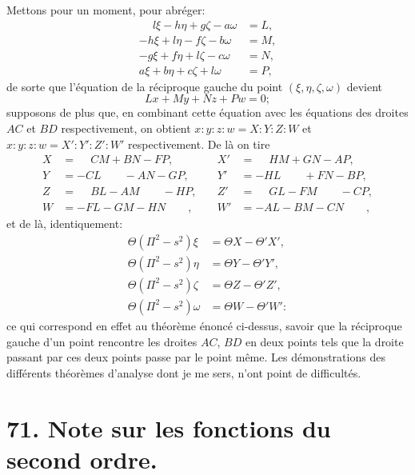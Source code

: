 \documentclass[11pt,a4paper]{book}
\begin{document}
\newpage

\setcounter{page}{420}

Mettons pour un moment, pour abr\'{e}ger:
\begin{align*}
\phantom{-}l\xi - h\eta + g\zeta - a\omega &= L, \\
-h\xi + l\eta - f\zeta - b\omega &= M, \\
-g\xi + f\eta + l\zeta - c\omega &= N, \\
a\xi + b\eta + c\zeta + l\omega &= P,
\end{align*}
de sorte que l'\'{e}quation de la r\'{e}ciproque gauche du point $(\xi, \eta, \zeta, \omega)$ devient
\[
Lx + My + Nz + Pw = 0;
\]
supposons de plus que, en combinant cette \'{e}quation avec les \'{e}quations des droites $AC$ et $BD$ respectivement, on obtient $x:y:z:w = X:Y:Z:W$ et $x:y:z:w = X':Y':Z':W'$ respectivement. De l\`{a} on tire
\begin{align*}
X &= \phantom{-}CM + BN - FP, &\quad X' &= \phantom{-}HM + GN - AP, \\
Y &= -CL \qquad - AN - GP, &\quad Y' &= -HL \qquad + FN - BP, \\
Z &= \phantom{-}BL - AM \qquad - HP, &\quad Z' &= \phantom{-}GL - FM \qquad - CP, \\
W &= -FL - GM - HN \qquad, &\quad W' &= -AL - BM - CN \qquad,
\end{align*}
et de l\`{a}, identiquement:
\begin{align*}
\Theta(\Pi^{2} - s^{2})\xi &= \Theta X - \Theta' X', \\
\Theta(\Pi^{2} - s^{2})\eta &= \Theta Y - \Theta' Y', \\
\Theta(\Pi^{2} - s^{2})\zeta &= \Theta Z - \Theta' Z', \\
\Theta(\Pi^{2} - s^{2})\omega &= \Theta W - \Theta' W':
\end{align*}
ce qui correspond en effet au th\'{e}or\`{e}me \'{e}nonc\'{e} ci-dessus, savoir que la r\'{e}ciproque gauche d'un point rencontre les droites $AC$, $BD$ en deux points tels que la droite passant par ces deux points passe par le point m\^{e}me. Les d\'{e}monstrations des diff\'{e}rents th\'{e}or\`{e}mes d'analyse dont je me sers, n'ont point de difficult\'{e}s.



\newpage
\section*{71. Note sur les fonctions du second ordre.}
\end{document}
